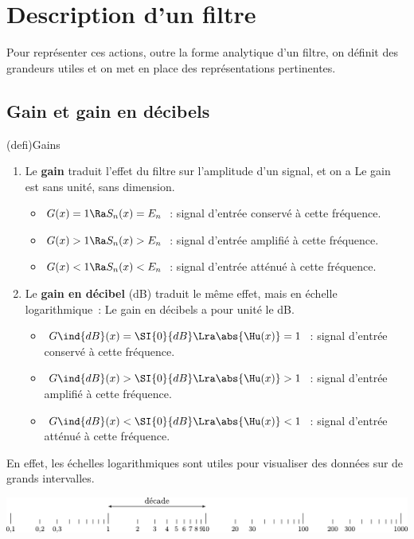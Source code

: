 \documentclass[../../main/main.tex]{subfiles}
\begin{document}

\section{Description d'un filtre}
Pour représenter ces actions, outre la forme analytique d'un filtre, on définit
des grandeurs utiles et on met en place des représentations pertinentes.

\subsection{Gain et gain en décibels}
\begin{tcb*}(defi){Gains}
	\begin{enumerate}
		\item Le \textbf{gain} traduit l'effet du filtre sur l'amplitude d'un
		      signal, et on a
		      \psw{
			      \[
				      \boxed{G(x) = \abs{\Hu(x)} = \frac{S_n(x)}{E_n}}
			      \]
		      }
		      Le gain est sans unité, sans dimension.
		      \begin{itemize}
			      \item $G(x) = 1 \Ra S_n(x) = E_n$~: signal d'entrée conservé à cette
			            fréquence.
			      \item $G(x) > 1 \Ra S_n(x) > E_n$~: signal d'entrée amplifié à cette
			            fréquence.
			      \item $G(x) < 1 \Ra S_n(x) < E_n$~: signal d'entrée atténué à cette
			            fréquence.
		      \end{itemize}
		\item Le \textbf{gain en décibel} (\si{dB}) traduit le même effet, mais en
		      échelle logarithmique~:
		      \psw{
			      \[
				      \boxed{G\ind{dB}(x) = 20 \log \abs{\Hu(x)}}
			      \]
		      }
		      Le gain en décibels a pour unité le \si{dB}.
		      \begin{itemize}
			      \item $G\ind{dB}(x) = \SI{0}{dB} \Lra \abs{\Hu(x)} = 1$~: signal
			            d'entrée conservé à cette fréquence.
			      \item $G\ind{dB}(x) > \SI{0}{dB} \Lra \abs{\Hu(x)} > 1$~: signal
			            d'entrée amplifié à cette fréquence.
			      \item $G\ind{dB}(x) < \SI{0}{dB} \Lra \abs{\Hu(x)} < 1$~: signal
			            d'entrée atténué à cette fréquence.
		      \end{itemize}
	\end{enumerate}
\end{tcb*}
En effet, les échelles logarithmiques sont utiles pour visualiser des données
sur de grands intervalles.
\smallbreak
\noindent
\begin{minipage}{\linewidth}
	\centering
	\includegraphics[width=\linewidth]{logscale}
	\label{fig:logscale}
\end{minipage}
\end{document}
